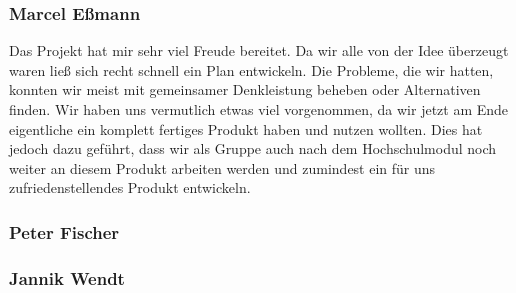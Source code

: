 \subsubsection{Marcel Eßmann}
Das Projekt hat mir sehr viel Freude bereitet. Da wir alle von der Idee überzeugt waren ließ sich recht schnell ein Plan entwickeln. Die Probleme, die wir hatten, konnten wir meist mit gemeinsamer Denkleistung beheben oder Alternativen finden.
Wir haben uns vermutlich etwas viel vorgenommen, da wir jetzt am Ende eigentliche ein komplett fertiges Produkt haben und nutzen wollten. Dies hat jedoch dazu geführt, dass wir als Gruppe auch nach dem Hochschulmodul noch weiter an diesem Produkt arbeiten werden und zumindest ein für uns zufriedenstellendes Produkt entwickeln. 

\subsubsection{Peter Fischer}

\subsubsection{Jannik Wendt}